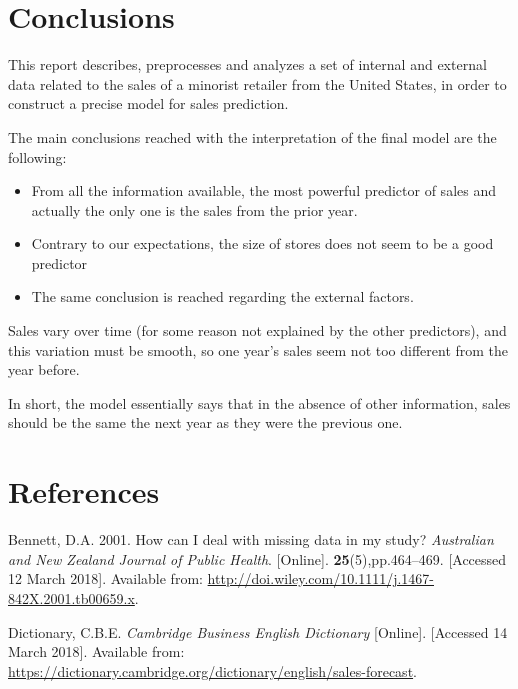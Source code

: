 \documentclass[11pt,]{article}
\providecommand{\tightlist}{%
  \setlength{\itemsep}{0pt}\setlength{\parskip}{0pt}}
\begin{document}
\section{Conclusions}\label{conclusions}

This report describes, preprocesses and analyzes a set of internal and
external data related to the sales of a minorist retailer from the
United States, in order to construct a precise model for sales
prediction.

The main conclusions reached with the interpretation of the final model
are the following:

\begin{itemize}
\tightlist
\item
  From all the information available, the most powerful predictor of
  sales and actually the only one is the sales from the prior year.
\item
  Contrary to our expectations, the size of stores does not seem to be a
  good predictor
\item
  The same conclusion is reached regarding the external factors.
\end{itemize}

Sales vary over time (for some reason not explained by the other
predictors), and this variation must be smooth, so one year's sales seem
not too different from the year before.

In short, the model essentially says that in the absence of other
information, sales should be the same the next year as they were the
previous one.

\section*{References}\label{references}

\hypertarget{refs}{}
\hypertarget{ref-bennett_how_2001}{}
Bennett, D.A. 2001. How can I deal with missing data in my study?
\emph{Australian and New Zealand Journal of Public Health}.
{[}Online{]}. \textbf{25}(5),pp.464--469. {[}Accessed 12 March 2018{]}.
Available from:
\url{http://doi.wiley.com/10.1111/j.1467-842X.2001.tb00659.x}.

\hypertarget{ref-cambridge_business_english_dictionary_cambridge_nodate}{}
Dictionary, C.B.E. \emph{Cambridge Business English Dictionary}
{[}Online{]}. {[}Accessed 14 March 2018{]}. Available from:
\url{https://dictionary.cambridge.org/dictionary/english/sales-forecast}.
\end{document}
